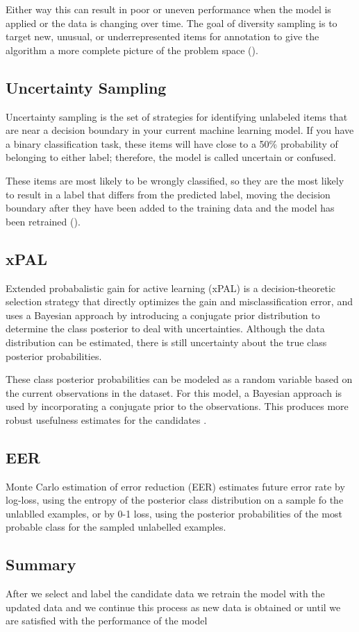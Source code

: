 Either way this can result in poor or uneven performance when the model is applied or the data is changing over time. The goal of diversity sampling is to target new, unusual, or underrepresented items for annotation to give the algorithm a more complete picture of the problem space (\cite{munro2021human}). 

\subsection{Uncertainty Sampling}
Uncertainty sampling is the set of strategies for identifying unlabeled items that are near a decision boundary in your current machine learning model. If you have a binary classification task, these items will have close to a 50\% probability of belonging to either label; therefore, the model is called uncertain or confused. 

These items are most likely to be wrongly classified, so they are the most likely to result in a label that differs from the predicted label, moving the decision boundary after they have been added to the training data and the model has been retrained (\cite{munro2021human}).

\subsection{xPAL}
Extended probabalistic gain for active learning (xPAL) is a decision-theoretic selection strategy that directly optimizes the gain and misclassification error, and uses a Bayesian approach by introducing a conjugate prior distribution to determine the class posterior to deal with uncertainties. Although the data distribution can be estimated, there is still uncertainty about the true class posterior probabilities. 

These class posterior probabilities can be modeled as a random variable based on the current observations in the dataset. For this model, a Bayesian approach is used by incorporating a conjugate prior to the observations. This produces more robust usefulness estimates for the candidates \cite{kottke2021toward}.

\subsection{EER}
Monte Carlo estimation of error reduction (EER) estimates future error rate by log-loss, using the entropy of the posterior class distribution on a sample fo the unlablled examples, or by 0-1 loss, using the posterior probabilities of the most probable class for the sampled unlabelled examples. 
\cite{roy2001toward}

\subsection{Summary}
After we select and label the candidate data we retrain the model with the updated data and we continue this process as new data is obtained or until we are satisfied with the performance of the model


